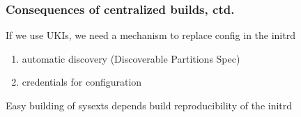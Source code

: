 \documentclass[]{beamer}
\newcommand\pp\pause
\begin{document}







\begin{frame}
  \frametitle{Consequences of centralized builds, ctd.}

  If we use UKIs,
  we need a mechanism to replace config in the initrd
  \pause

  \begin{enumerate}
  \item automatic discovery (Discoverable Partitions Spec)\pause
  \item credentials for configuration\pause
  \end{enumerate}

  \vfill{}

  Easy building of sysexts depends build reproducibility of the initrd
\end{frame}







\end{document}
